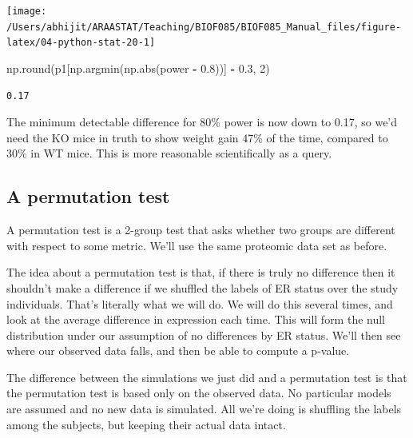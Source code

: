 \documentclass[
  letterpaper,
]{scrbook}
\newenvironment{Shaded}{\begin{snugshade}}{\end{snugshade}}
\newcommand{\BuiltInTok}[1]{#1}
\newcommand{\DecValTok}[1]{\textcolor[rgb]{0.00,0.00,0.81}{#1}}
\newcommand{\FloatTok}[1]{\textcolor[rgb]{0.00,0.00,0.81}{#1}}
\newcommand{\NormalTok}[1]{#1}
\newcommand{\OperatorTok}[1]{\textcolor[rgb]{0.81,0.36,0.00}{\textbf{#1}}}
\begin{document}
\begin{center}\texttt{[image: /Users/abhijit/ARAASTAT/Teaching/BIOF085/BIOF085\_Manual\_files/figure-latex/04-python-stat-20-1]} \end{center}

\begin{Shaded}
\begin{Highlighting}[]
\NormalTok{np.}\BuiltInTok{round}\NormalTok{(p1[np.argmin(np.}\BuiltInTok{abs}\NormalTok{(power }\OperatorTok{-} \FloatTok{0.8}\NormalTok{))] }\OperatorTok{-} \FloatTok{0.3}\NormalTok{, }\DecValTok{2}\NormalTok{)}
\end{Highlighting}
\end{Shaded}

\begin{verbatim}
0.17
\end{verbatim}

The minimum detectable difference for 80\% power is now down to 0.17, so we'd need the KO mice in truth to show weight gain 47\% of the time, compared to 30\% in WT mice. This is more reasonable scientifically as a query.

\hypertarget{a-permutation-test}{%
\subsection{A permutation test}\label{a-permutation-test}}

A permutation test is a 2-group test that asks whether two groups are different with respect to some metric. We'll use the same proteomic data set as before.

The idea about a permutation test is that, if there is truly no difference then it shouldn't make a difference if we shuffled the labels of ER status over the study individuals. That's literally what we will do. We will do this several times, and look at the average difference in expression each time. This will form the null distribution under our assumption of no differences by ER status. We'll then see where our observed data falls, and then be able to compute a p-value.

The difference between the simulations we just did and a permutation test is that the permutation test is based only on the observed data. No particular models are assumed and no new data is simulated. All we're doing is shuffling the labels among the subjects, but keeping their actual data intact.
\end{document}
